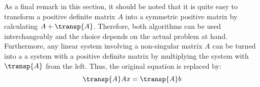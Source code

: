 \noindent As a final remark in this section, it should be noted that it is quite easy to transform a positive definite matrix $A$ into a symmetric positive matrix by calculating $A+\transp{A}$. Therefore, both algorithms can be used interchangeably and the choice depends on the actual problem at hand. Furthermore, any linear system involving a non-singular matrix $A$ can be turned into a a system with a positive definite matrix by multiplying the system with $\transp{A}$ from the left. Thus, the original equation is replaced by:
\begin{equation}
    \transp{A}Ax = \transp{A}b
\end{equation}


